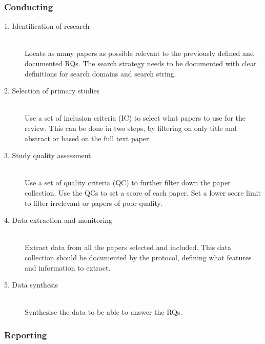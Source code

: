
\subsubsection{Conducting}

\begin{description}

	\item[1. Identification of research] \hfill \\
		Locate as many papers as possible relevant to the previously defined and documented RQs. The search strategy needs to be documented with clear definitions for search domains and search string.

	\item[2. Selection of primary studies] \hfill \\
		Use a set of inclusion criteria (IC) to select what papers to use for the review. This can be done in two steps, by filtering on only title and abstract or based on the full text paper. 

	\item[3. Study quality assessment] \hfill \\
		Use a set of quality criteria (QC) to further filter down the paper collection. Use the QCs to set a score of each paper. Set a lower score limit to filter irrelevant or papers of poor quality.

	\item[4. Data extraction and monitoring] \hfill \\
		Extract data from all the papers selected and included. This data collection should be documented by the protocol, defining what features and information to extract.
	

	\item[5. Data synthesis] \hfill \\
		Synthesise the data to be able to answer the RQs. 
\end{description}


\subsubsection{Reporting}


